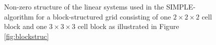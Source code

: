 \begin{figure}
  \centering
  
  \caption{Non-zero structure of the linear systems used in the SIMPLE-algorithm for a block-structured grid consisting of one $2\times2\times2$ cell block and one $3\times3\times3$ cell block as illustrated in Figure \ref{fig:blockstruc}}
  \label{fig:segassemble}
\end{figure}

